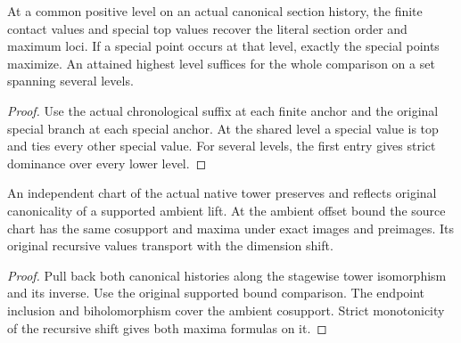 \begin{theorem}
\label{hir:g1-later-literal-mixed-section-stratum}
\leanok
At a common positive level on an actual canonical section
history, the finite contact values and special top values
recover the literal section order and maximum loci. If a
special point occurs at that level, exactly the special
points maximize. An attained highest level suffices for
the whole comparison on a set spanning several levels.
\end{theorem}
\begin{proof}
Use the actual chronological suffix at each finite anchor
and the original special branch at each special anchor.
At the shared level a special value is top and ties every
other special value. For several levels, the first entry
gives strict dominance over every lower level.
\end{proof}

\begin{theorem}
\label{hir:g1-original-native-chart-comparison}
\leanok
An independent chart of the actual native tower preserves
and reflects original canonicality of a supported ambient
lift. At the ambient offset bound the source chart has the
same cosupport and maxima under exact images and preimages.
Its original recursive values transport with the dimension
shift.
\end{theorem}
\begin{proof}
Pull back both canonical histories along the stagewise
tower isomorphism and its inverse. Use the original
supported bound comparison. The endpoint inclusion and
biholomorphism cover the ambient cosupport. Strict
monotonicity of the recursive shift gives both maxima
formulas on it.
\end{proof}

